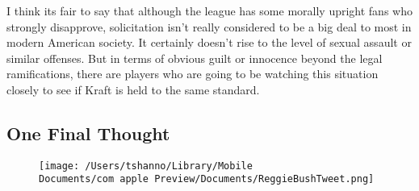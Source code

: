 \documentclass[11pt]{article}
\begin{document}
I think its fair to say that although the league has some morally upright fans who strongly disapprove, solicitation isn't really considered to be a big deal to most in modern American society.  It certainly doesn't rise to the level of sexual assault or similar offenses.  But in terms of obvious guilt or innocence beyond the legal ramifications, there are players who are going to be watching this situation closely to see if Kraft is held to the same standard.


\subsection{One Final Thought}
\begin{figure}
  \centering
  \texttt{[image: /Users/tshanno/Library/Mobile Documents/com~apple~Preview/Documents/ReggieBushTweet.png]}
\end{figure}
\end{document}
